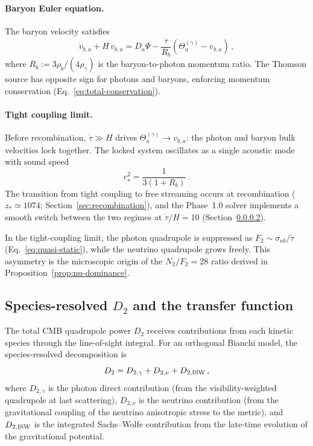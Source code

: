 \paragraph{Baryon Euler equation.}

The baryon velocity satisfies
\begin{equation}\label{eq:baryon-euler}
\dot{v}_{b,a}
+ H\, v_{b,a}
= D_a \Psi
- \frac{\dot{\tau}}{R_b}\left(
  \Theta^{(\gamma)}_a - v_{b,a}
\right)\,,
\end{equation}
where $R_b := 3\rho_b/(4\rho_\gamma)$ is the
baryon-to-photon momentum ratio.  The Thomson source
has opposite sign for photons and baryons, enforcing
momentum conservation
(Eq.~\ref{eq:total-conservation}).


\paragraph{Tight coupling limit.}
\label{sec:tight-coupling}

Before recombination, $\dot{\tau} \gg H$ drives
$\Theta^{(\gamma)}_a \to v_{b,a}$: the photon and
baryon bulk velocities lock together.  The locked
system oscillates as a single acoustic mode with
sound speed
\begin{equation}\label{eq:sound-speed}
c_s^2 = \frac{1}{3(1 + R_b)}\,.
\end{equation}
The transition from tight coupling to free streaming
occurs at recombination ($z_* \simeq 1074$;
Section~\ref{sec:recombination}), and the Phase~1.0
solver implements a smooth switch between the two
regimes at $\dot{\tau}/H = 10$
(Section~\ref{sec:tight-coupling}).

In the tight-coupling limit, the photon quadrupole is
suppressed as $F_2 \sim \sigma_{ab}/\dot{\tau}$
(Eq.~\ref{eq:quasi-static}), while the neutrino
quadrupole grows freely.  This asymmetry is the
microscopic origin of the $N_2/F_2 = 28$ ratio
derived in Proposition~\ref{prop:nu-dominance}.


\subsection{Species-resolved $D_2$ and the transfer function}
\label{sec:species-D2}
\label{sec:ISW-contribution}

The total CMB quadrupole power $D_2$ receives
contributions from each kinetic species through the
line-of-sight integral.  For an orthogonal Bianchi
model, the species-resolved decomposition is
\begin{equation}\label{eq:D2-decomp}
D_2 = D_{2,\gamma} + D_{2,\nu}
    + D_{2,\rm ISW}\,,
\end{equation}
where $D_{2,\gamma}$ is the photon direct contribution
(from the visibility-weighted quadrupole at last
scattering), $D_{2,\nu}$ is the neutrino contribution
(from the gravitational coupling of the neutrino
anisotropic stress to the metric), and
$D_{2,\rm ISW}$ is the integrated Sachs--Wolfe
contribution from the late-time evolution of the
gravitational potential.

